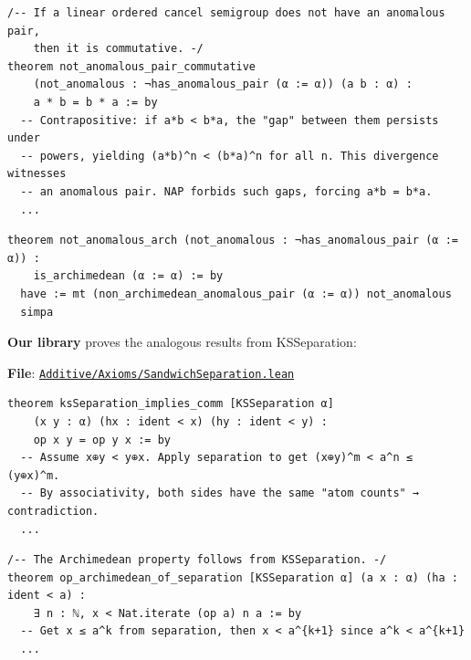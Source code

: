 \documentclass[11pt]{article}
\theoremstyle{definition}
\theoremstyle{remark}
\begin{document}
\begin{lstlisting}[caption={NAP $\Rightarrow$ Commutativity (Paul, \href{https://github.com/ericluap/OrderedSemigroups/blob/main/OrderedSemigroups/Archimedean.lean\#L357-L395}{Archimedean.lean:357--395})},numbers=none]
/-- If a linear ordered cancel semigroup does not have an anomalous pair,
    then it is commutative. -/
theorem not_anomalous_pair_commutative
    (not_anomalous : ¬has_anomalous_pair (α := α)) (a b : α) :
    a * b = b * a := by
  -- Contrapositive: if a*b < b*a, the "gap" between them persists under
  -- powers, yielding (a*b)^n < (b*a)^n for all n. This divergence witnesses
  -- an anomalous pair. NAP forbids such gaps, forcing a*b = b*a.
  ...
\end{lstlisting}

\begin{lstlisting}[caption={NAP $\Rightarrow$ Archimedean (Paul, \href{https://github.com/ericluap/OrderedSemigroups/blob/main/OrderedSemigroups/Archimedean.lean\#L397-L400}{Archimedean.lean:397--400})},numbers=none]
theorem not_anomalous_arch (not_anomalous : ¬has_anomalous_pair (α := α)) :
    is_archimedean (α := α) := by
  have := mt (non_archimedean_anomalous_pair (α := α)) not_anomalous
  simpa
\end{lstlisting}

\textbf{Our library} proves the analogous results from KSSeparation:

\textbf{File}: \href{https://github.com/zariuq/ks-foundations-of-inference/blob/main/KnuthSkilling/Additive/Axioms/SandwichSeparation.lean}{\texttt{Additive/Axioms/SandwichSeparation.lean}}

\begin{lstlisting}[caption={Separation $\Rightarrow$ Commutativity (\href{https://github.com/zariuq/ks-foundations-of-inference/blob/main/KnuthSkilling/Additive/Axioms/SandwichSeparation.lean\#L404}{SandwichSeparation.lean:404})},numbers=none]
theorem ksSeparation_implies_comm [KSSeparation α]
    (x y : α) (hx : ident < x) (hy : ident < y) :
    op x y = op y x := by
  -- Assume x⊕y < y⊕x. Apply separation to get (x⊕y)^m < a^n ≤ (y⊕x)^m.
  -- By associativity, both sides have the same "atom counts" → contradiction.
  ...
\end{lstlisting}

\begin{lstlisting}[caption={Separation $\Rightarrow$ Archimedean (\href{https://github.com/zariuq/ks-foundations-of-inference/blob/main/KnuthSkilling/Additive/Axioms/SandwichSeparation.lean\#L132-L144}{SandwichSeparation.lean:132--144})},numbers=none]
/-- The Archimedean property follows from KSSeparation. -/
theorem op_archimedean_of_separation [KSSeparation α] (a x : α) (ha : ident < a) :
    ∃ n : ℕ, x < Nat.iterate (op a) n a := by
  -- Get x ≤ a^k from separation, then x < a^{k+1} since a^k < a^{k+1}
  ...
\end{lstlisting}
\end{document}
